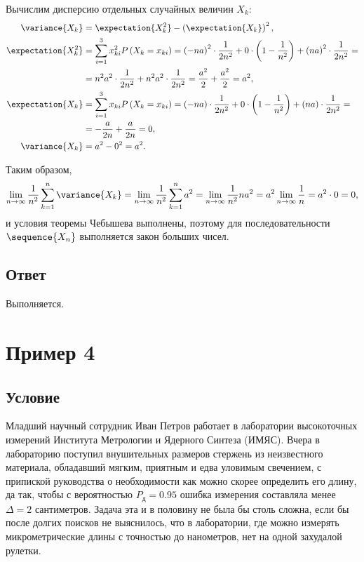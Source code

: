 \documentclass[a4paper,12pt]{article}
\begin{document}
    Вычислим дисперсию отдельных случайных величин $X_k$:
    \begin{align}
        \variance{X_k} & = \expectation{X_k^2} - \left ( \expectation{X_k} \right )^2 , \\
        \expectation{X_k^2}
        & = \sum_{i=1}^3 x_{ki}^2 \probability{X_k = x_{ki}}
        = \left ( -na \right )^2 \cdot \frac{1}{2 n^2} + 0 \cdot \left ( 1 - \frac{1}{n^2} \right ) + \left ( na \right )^2 \cdot \frac{1}{2 n^2} = \notag \\
        & = n^2 a^2 \cdot \frac{1}{2 n^2} + n^2 a^2 \cdot \frac{1}{2 n^2}
        = \frac{a^2}{2} + \frac{a^2}{2} = a^2 , \\
        \expectation{X_k}
        & = \sum_{i=1}^3 x_{ki} \probability{X_k = x_{ki}}
        = \left ( -na \right ) \cdot \frac{1}{2 n^2} + 0 \cdot \left ( 1 - \frac{1}{n^2} \right ) + \left ( na \right ) \cdot \frac{1}{2 n^2} = \notag \\
        & = - \frac{a}{2 n} + \frac{a}{2 n} = 0,\\
        \variance{X_k} & = a^2 - 0^2 = a^2 .
    \end{align}

    Таким образом,
    \begin{equation}
        \lim_{n \rightarrow \infty} \frac{1}{n^2} \sum_{k=1}^n \variance{X_k}
        = \lim_{n \rightarrow \infty} \frac{1}{n^2} \sum_{k=1}^n a^2
        = \lim_{n \rightarrow \infty} \frac{1}{n^2} n a^2
        = a^2 \lim_{n \rightarrow \infty} \frac{1}{n} = a^2 \cdot 0 = 0,
    \end{equation}
    и условия теоремы Чебышева выполнены, поэтому для последовательности $\sequence{X_n}$ выполняется закон больших чисел.

    \subsection*{Ответ}
    Выполняется.


    \section{Пример 4}
    \subsection*{Условие}
    Младший научный сотрудник Иван Петров работает в лаборатории высокоточных измерений Института Метрологии и Ядерного Синтеза (ИМЯС).
    Вчера в лабораторию поступил внушительных размеров стержень из неизвестного материала, обладавший мягким, приятным и едва уловимым свечением,
    с припиской руководства о необходимости как можно скорее определить его длину, да так, чтобы с вероятностью $P_\text{д} = 0.95$ ошибка измерения составляла менее
    $\Delta = 2$ сантиметров. Задача эта и в половину не была бы столь сложна, если бы после долгих поисков не выяснилось, что в лаборатории, где можно измерять
    микрометрические длины с точностью до нанометров, нет на одной захудалой рулетки.
\end{document}

